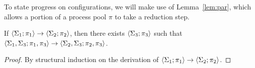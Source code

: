 

To state progress on configurations, we will make use of Lemma~\ref{lem:par},
which allows a portion of a process pool $\pi$ to take a reduction step. 

\begin{lemma}\label{lem:par}
If $\left<\Sigma_1;\pi_1\right> -> \left<\Sigma_2;\pi_2\right>$,
then there exists $\left<\Sigma_3;\pi_3\right>$ such that
$\left<\Sigma_1,\Sigma_3;\pi_1, \pi_3\right> ->
\left<\Sigma_2,\Sigma_3;\pi_2,\pi_3\right>$.
\begin{proof}
  By structural induction on the derivation of
  $\left<\Sigma_1;\pi_1\right> -> \left<\Sigma_2;\pi_2\right>$.
\end{proof}
\end{lemma}

